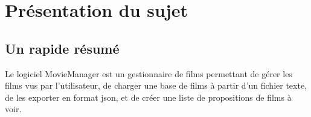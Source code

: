 \section{Présentation du sujet} %

\subsection{Un rapide résumé}
Le logiciel MovieManager est un gestionnaire de films permettant de gérer les films vus par l'utilisateur, de charger une base de films à partir d'un fichier texte, de les exporter en format json, et de créer une liste de propositions de films à voir.
 

